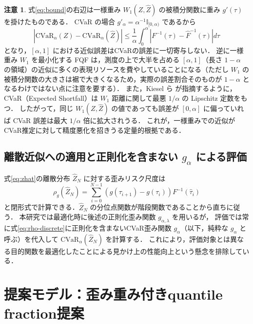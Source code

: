 \documentclass[a4paper,10pt]{jsarticle}
\theoremstyle{definition}
\newtheorem{remark}{注意}[section]
\newcommand{\CVaR}{\mathrm{CVaR}}
\newcommand{\Wone}{W_1}
\newcommand{\Finv}{F^{-1}}
\newcommand{\Fhinv}{\hat{F}^{-1}}
\begin{document}
\begin{remark}
式\eqref{eq:bound}の右辺は一様重み $\Wone(Z,\hat Z)$ の被積分関数に重み $g'(\tau)$ を掛けたものである．
CVaR の場合 $g'_\alpha=\alpha^{-1}\mathbb{I}_{[0,\alpha)}$ であるから
\begin{equation}
  \left|\CVaR_\alpha(Z)-\CVaR_\alpha(\hat Z)\right|\le\frac1\alpha\int_0^\alpha\left|\Finv(\tau)-\Fhinv(\tau)\right|d\tau
  \label{eq:bound-cvar}
\end{equation}
となり，$[\alpha,1]$ における近似誤差はCVaRの誤差に一切寄与しない．
逆に一様重み $\Wone$ を最小化する FQF は，測度の上で大半を占める $[\alpha,1]$（長さ $1-\alpha$ の領域）の近似に多くの表現リソースを費やしていることになる（ただし $W_1$ の被積分関数の大きさは裾で大きくなるため，実際の誤差割合そのものが $1-\alpha$ となるわけではない点に注意を要する）．
また，Kiesel ら \cite{kiesel2016wasserstein} が指摘するように，CVaR（Expected Shortfall）は $W_1$ 距離に関して最悪 $1/\alpha$ の Lipschitz 定数をもつ．
したがって，同じ $\Wone(Z,\hat Z)$ の値であっても誤差が $[0,\alpha]$ に偏っていれば CVaR 誤差は最大 $1/\alpha$ 倍に拡大されうる．
これが，一様重みでの近似がCVaR推定に対して精度悪化を招きうる定量的根拠である．
\end{remark}
\subsection{離散近似への適用と正則化を含まない $g_\alpha$ による評価}
式\eqref{eq:zhat}の離散分布 $\hat Z_N$ に対する歪みリスク尺度は
\begin{equation}
  \rho_g(\hat Z_N)=\sum_{i=0}^{N-1}\left(g(\tau_{i+1})-g(\tau_i)\right)\Finv(\hat\tau_i)
  \label{eq:rho-discrete}
\end{equation}
と閉形式で計算できる．$\hat Z_N$ の分位点関数が階段関数であることから直ちに従う．
本研究では最適化時に後述の正則化歪み関数 $g_{\alpha,\lambda}$ を用いるが，
評価では常に式\eqref{eq:rho-discrete}に正則化を含まないCVaR歪み関数 $g_\alpha$（以下，純粋な $g_\alpha$ と呼ぶ）を代入して $\CVaR_\alpha(\hat Z_N)$ を計算する．
これにより，評価対象とは異なる目的関数を最適化したことによる見かけ上の性能向上という懸念を排除している．

\section{提案モデル：歪み重み付きquantile fraction提案}
\label{sec:proposed}
\end{document}
